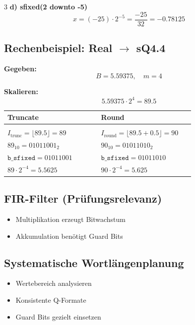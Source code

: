 \documentclass[10pt,a4paper]{article}
\begin{document}
\begin{multicols}{3}
\textbf{d) sfixed(2 downto -5)}
\[
x = (-25) \cdot 2^{-5} = \frac{-25}{32} = -0.78125
\]

\subsection{Rechenbeispiel: Real $\rightarrow$ sQ4.4}

\textbf{Gegeben:}
\[
B = 5.59375, \quad m=4
\]

\textbf{Skalieren:}
\[
5.59375 \cdot 2^4 = 89.5
\]

\begin{center}
\begin{tabular}{p{0.45\linewidth} p{0.45\linewidth}}
\textbf{Truncate} & \textbf{Round} \\[0.5ex]
\hline \\[-1.5ex]

$I_{\text{trunc}} = \lfloor 89.5 \rfloor = 89$ &
$I_{\text{round}} = \lfloor 89.5 + 0.5 \rfloor = 90$ \\[1ex]

$89_{10} = 01011001_2$ &
$90_{10} = 01011010_2$ \\[1ex]

$\texttt{b\_sfixed} = 01011001$ &
$\texttt{b\_sfixed} = 01011010$ \\[1ex]

$89 \cdot 2^{-4} = 5.5625$ &
$90 \cdot 2^{-4} = 5.625$
\end{tabular}
\end{center}

\subsection{FIR-Filter (Prüfungsrelevanz)}

\begin{itemize}
  \item Multiplikation erzeugt Bitwachstum
  \item Akkumulation benötigt Guard Bits
\end{itemize}


\subsection{Systematische Wortlängenplanung}

\begin{itemize}
  \item Wertebereich analysieren
  \item Konsistente Q-Formate
  \item Guard Bits gezielt einsetzen
\end{itemize}


\end{multicols}
\end{document}
